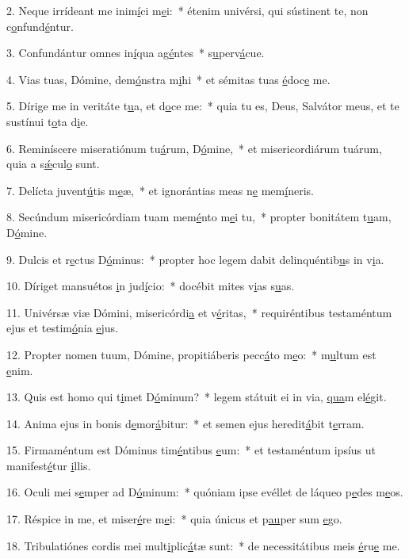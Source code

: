 2. Neque irrídeant me inim\uline{í}ci m\uline{e}i:~* étenim univérsi, qui sústinent te, non c\uline{o}nfund\uline{é}ntur.\par 
3. Confundántur omnes in\uline{í}qua ag\uline{é}ntes~* s\uline{u}perv\uline{á}cue.\par 
4. Vias tuas, Dómine, dem\uline{ó}nstra m\uline{i}hi~* et sémitas tuas \uline{é}doc\uline{e} me.\par 
5. Dírige me in veritáte t\uline{u}a, et d\uline{o}ce me:~* quia tu es, Deus, Salvátor meus, et te sustínui t\uline{o}ta d\uline{i}e.\par 
6. Reminíscere miseratiónum tu\uline{á}rum, D\uline{ó}mine,~* et misericordiárum tuárum, quia a s\uline{ǽ}cul\uline{o} sunt.\par 
7. Delícta juvent\uline{ú}tis m\uline{e}æ,~* et ignorántias meas n\uline{e} mem\uline{í}neris.\par 
8. Secúndum misericórdiam tuam mem\uline{é}nto m\uline{e}i tu,~* propter bonitátem t\uline{u}am, D\uline{ó}mine.\par 
9. Dulcis et r\uline{e}ctus D\uline{ó}minus:~* propter hoc legem dabit delinquéntib\uline{u}s in v\uline{i}a.\par 
10. Díriget mansuétos \uline{i}n jud\uline{í}cio:~* docébit mites v\uline{i}as s\uline{u}as.\par 
11. Univérsæ viæ Dómini, misericórdi\uline{a} et v\uline{é}ritas,~* requiréntibus testaméntum ejus et testim\uline{ó}nia \uline{e}jus.\par 
12. Propter nomen tuum, Dómine, propitiáberis pecc\uline{á}to m\uline{e}o:~* m\uline{u}ltum est \uline{e}nim.\par 
13. Quis est homo qui t\uline{i}met D\uline{ó}minum?~* legem státuit ei in via, \uline{qua}m el\uline{é}git.\par 
14. Anima ejus in bonis d\uline{e}mor\uline{á}bitur:~* et semen ejus heredit\uline{á}bit t\uline{e}rram.\par 
15. Firmaméntum est Dóminus tim\uline{é}ntibus \uline{e}um:~* et testaméntum ipsíus ut manifest\uline{é}tur \uline{i}llis.\par 
16. Oculi mei s\uline{e}mper ad D\uline{ó}minum:~* quóniam ipse evéllet de láqueo p\uline{e}des m\uline{e}os.\par 
17. Réspice in me, et miser\uline{é}re m\uline{e}i:~* quia únicus et p\uline{au}per sum \uline{e}go.\par 
18. Tribulatiónes cordis mei mult\uline{i}plic\uline{á}tæ sunt:~* de necessitátibus meis \uline{é}ru\uline{e} me.\par 
